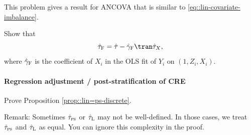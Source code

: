 This problem gives a result for ANCOVA that is similar to \eqref{eq::lin-covariate-imbalance}. 

Show that
$$
\hat{\tau}_\textsc{F} =\hat\tau  - \hat\gamma_\textsc{F}\tran \hat\tau_X,
$$
where $ \hat\gamma_\textsc{F}$ is the coefficient of $X_i$ in the OLS fit of $Y_i$ on $(1,Z_i, X_i)$. 





 \paragraph{Regression adjustment / post-stratification of CRE}\label{para::lin=ps-discrete}
 
 Prove Proposition \ref{prop::lin=ps-discrete}. 
 
 
Remark:  Sometimes $\hat{\tau}_{\textsc{ps}}$ or $ \hat{\tau}_\textsc{L}$ may not be well-defined. In those cases, we treat $\hat{\tau}_{\textsc{ps}}$ and $ \hat{\tau}_\textsc{L}$ as equal. You can ignore this complexity in the proof. 
 
%
%
%


